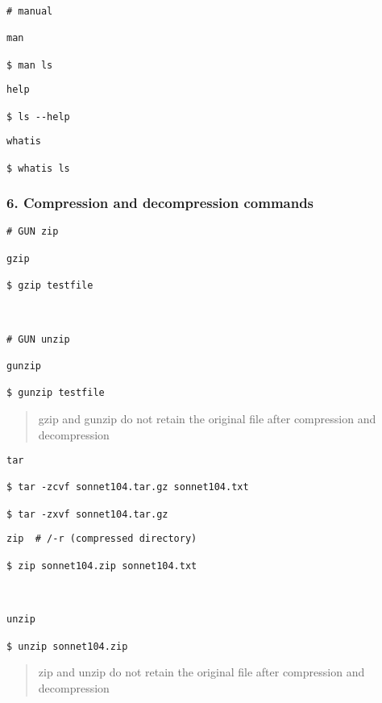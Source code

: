 \documentclass[
]{article}
\begin{document}
\begin{verbatim}
# manual

man 

$ man ls
\end{verbatim}

\begin{verbatim}
help

$ ls --help
\end{verbatim}

\begin{verbatim}
whatis

$ whatis ls
\end{verbatim}

\hypertarget{header-n2}{%
\subsubsection{6. Compression and decompression
commands}\label{header-n2}}

\begin{verbatim}
# GUN zip

gzip  

$ gzip testfile



# GUN unzip

gunzip

$ gunzip testfile
\end{verbatim}

\begin{quote}
gzip and gunzip do not retain the original file after compression and
decompression
\end{quote}

\begin{verbatim}
tar

$ tar -zcvf sonnet104.tar.gz sonnet104.txt

$ tar -zxvf sonnet104.tar.gz
\end{verbatim}

\begin{verbatim}
zip  # /-r (compressed directory)

$ zip sonnet104.zip sonnet104.txt



unzip

$ unzip sonnet104.zip
\end{verbatim}

\begin{quote}
zip and unzip do not retain the original file after compression and
decompression
\end{quote}
\end{document}
